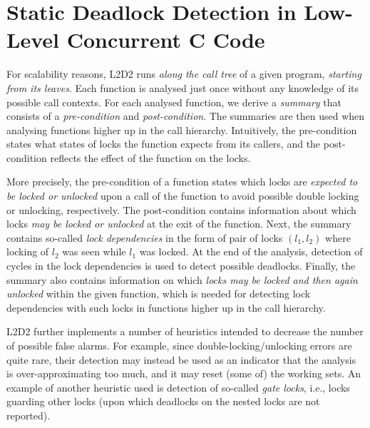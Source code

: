 \documentclass[runningheads]{llncs}
\begin{document}
\vspace*{-3mm}\section{Static Deadlock Detection in Low-Level Concurrent C
Code}\vspace*{-2mm}

For scalability reasons, L2D2 runs \emph{along the call tree} of a given
program, \emph{starting from its leaves}.
%
Each function is analysed just once without any knowledge of its possible call
contexts.
%
For each analysed function, we derive a \emph{summary} that consists of a
\emph{pre-condition} and \emph{post-condition}.
%
The summaries are then used when analysing functions higher up in the call
hierarchy.
%
Intuitively, the pre-condition states what states of locks the function expects
from its callers, and the post-condition reflects the effect of the function on
the locks.

More precisely, the pre-condition of a function states which locks are
\emph{expected to be locked or unlocked} upon a call of the function to avoid
possible double locking or unlocking, respectively.
%
The post-condition contains information about which locks \emph{may be locked or
unlocked} at the exit of the function.
%
Next, the summary contains so-called \emph{lock dependencies} in the form of
pair of locks $(l_1,l_2)$ where locking of $l_2$ was seen while $l_1$ was
locked.
%
At the end of the analysis, detection of cycles in the lock dependencies is used
to detect possible deadlocks.
%
Finally, the summary also contains information on which \emph{locks may be
locked and then again unlocked} within the given function, which is needed for
detecting lock dependencies with such locks in functions higher up in the call
hierarchy.

L2D2 further implements a number of heuristics intended to decrease the number
of possible false alarms.
%
For example, since double-locking/unlocking errors are quite rare, their
detection may instead be used as an indicator that the analysis is
over-approximating too much, and it may reset (some of) the working sets.
%
An example of another heuristic used is detection of so-called \emph{gate
locks}, i.e., locks guarding other locks (upon which deadlocks on the nested
locks are not reported).
\end{document}
